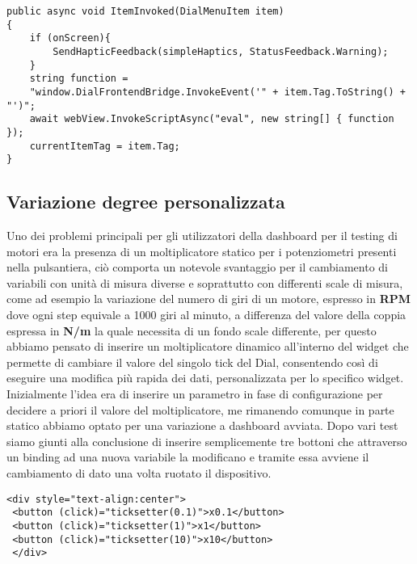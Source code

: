 \vspace{1.0cm}
\begin{lstlisting}[caption={Rilascio feedback selezione},style=javaScriptCode]
public async void ItemInvoked(DialMenuItem item)
{
	if (onScreen){
		SendHapticFeedback(simpleHaptics, StatusFeedback.Warning);
	}
	string function = 
	"window.DialFrontendBridge.InvokeEvent('" + item.Tag.ToString() + "')";
	await webView.InvokeScriptAsync("eval", new string[] { function });
	currentItemTag = item.Tag;
} 
\end{lstlisting} 
\vspace{1.0cm}

\subsection{Variazione degree personalizzata}
Uno dei problemi principali per gli utilizzatori della dashboard per il testing di motori era la presenza di un moltiplicatore statico per i potenziometri presenti nella pulsantiera, ciò comporta un notevole svantaggio per il cambiamento di variabili con unità di misura diverse e  soprattutto con differenti scale di misura, come ad esempio la variazione del numero di giri di un motore, espresso in \textbf{RPM} dove ogni step equivale a 1000 giri al minuto, a differenza del valore della coppia espressa in \textbf{N/m} la quale necessita di un fondo scale differente, per questo abbiamo pensato di inserire un moltiplicatore dinamico all'interno del widget che permette di cambiare il valore del singolo tick del Dial, consentendo così di eseguire una modifica più rapida dei dati, personalizzata per lo specifico widget.
Inizialmente l'idea era di inserire un parametro in fase di configurazione per decidere a priori il valore del moltiplicatore, me rimanendo comunque in parte statico abbiamo optato per una variazione a dashboard avviata.
Dopo vari test siamo giunti alla conclusione di inserire semplicemente tre bottoni che attraverso un binding ad una nuova variabile la modificano e tramite essa avviene il cambiamento di dato una volta ruotato il dispositivo.
\vspace{1.0cm}
\begin{lstlisting}[caption={Aggiunta dei bottoni all'interno del file HTML del componente},style=javaScriptCode]
 <div style="text-align:center">
 <button (click)="ticksetter(0.1)">x0.1</button>
 <button (click)="ticksetter(1)">x1</button>
 <button (click)="ticksetter(10)">x10</button>
 </div>
\end{lstlisting} 
\vspace{1.0cm}
